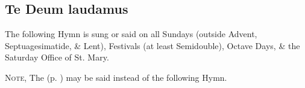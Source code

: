 \subsection{Te Deum laudamus}

\begin{rubric}
The following Hymn is sung or said on all Sundays (outside Advent, Septuagesimatide, \& Lent), Festivals (at least Semidouble), Octave Days, \& the Saturday Office of St. Mary. %
\end{rubric}
\begin{rubric}
	\textsc{Note,} The  (p. \pageref{OT}) may be said instead of the following Hymn.
\end{rubric}

